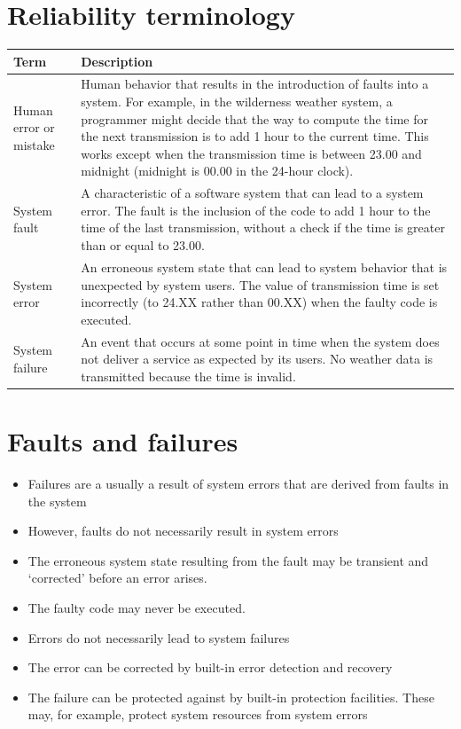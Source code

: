 \section{Reliability terminology}

\begin{table}[h!]
\centering
\begin{tabular}{ |p{3cm}|p{8cm}|  }
\hline
Term & Description \\
\hline
\hline
Human error or mistake & Human behavior that results in the introduction of faults into a system. For example, in the wilderness weather system, a programmer might decide that the way to compute the time for the next transmission is to add 1 hour to the current time. This works except when the transmission time is between 23.00 and midnight (midnight is 00.00 in the 24-hour clock).\\
\hline
System fault & A characteristic of a software system that can lead to a system error. The fault is the inclusion of the code to add 1 hour to the time of the last transmission, without a check if the time is greater than or equal to 23.00.\\
\hline
System error & An erroneous system state that can lead to system behavior that is unexpected by system users. The value of transmission time is set incorrectly (to 24.XX rather than 00.XX) when the faulty code is executed.\\
\hline
System failure & An event that occurs at some point in time when the system does not deliver a service as expected by its users. No weather data is transmitted because the time is invalid.\\
\hline
\end{tabular}

\label{table:T4_1}
\end{table}

\section{Faults and failures}
\begin{itemize}
\item Failures are a usually a result of system errors that are derived from faults in the system

\item However, faults do not necessarily result in system errors

  \item The erroneous system state resulting from the fault may be transient and ‘corrected’ before an error arises.
  \item The faulty code may never be executed.

\item Errors do not necessarily lead to system failures

  \item The error can be corrected by built-in error detection and recovery
  \item The failure can be protected against by built-in protection facilities. These may, for example, protect system resources from system errors


\end{itemize}
